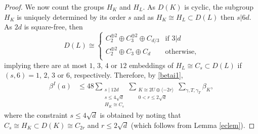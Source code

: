 \documentclass[12pt, a4paper]{article}
\newcommand{\la}{\langle}
\newcommand{\ra}{\rangle}
\newcommand{\op}{\oplus}
\begin{document}
\begin{proof}
    We now count the groups $H_K$ and $H_L$.
    As $D(K)$ is cyclic, the subgroup $H_K$ is uniquely determined by its order $s$ and as
    $H_K \cong H_L \subset D(L)$ then $s \vert 6d$.
As $2d$ is square-free, then
    \[
    D(L) \cong
    \begin{cases}
      C_2^{\op 2} \op C_3^{\op 2} \op C_{d/3} & \text{if $3 \vert d$} \\
      C_2^{\op 2} \op C_3 \op C_d & \text{otherwise,} \\
    \end{cases}
    \]
    implying there are at most $1$, $3$, $4$ or $12$ embeddings of $H_L \cong C_s \subset D(L)$ if  $(s, 6)=1$, $2$, $3$ or $6$, respectively. 
Therefore, by \eqref{betai1},
    \begin{align}
      \beta^I(a)
      & \leq
      48 \sum_{\substack{s \mid 12d \\ s \leq 4 \sqrt{d} \\ H_K \cong C_s}}
      \sum_{\substack{K \cong 2U \op \la -2r \ra \\ 0<r \leq 2\sqrt{d}}}
      \sum_{\gamma, T, \gamma_T} \beta_K, \label{betai2}
    \end{align}
    where the constraint  $s \leq 4 \sqrt{d}$ is obtained by noting that $C_s \cong H_K \subset D(K) \cong C_{2r}$ and $r \leq 2 \sqrt{d}$ (which follows from Lemma \ref{eclem}).


\end{proof}
\end{document}
